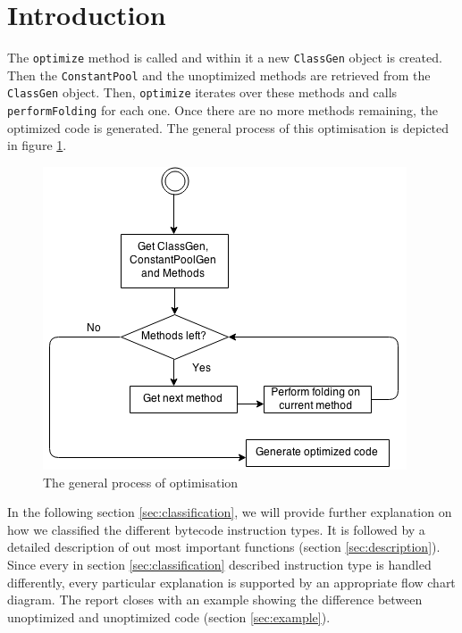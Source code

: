 \section{Introduction}

The \texttt{optimize} method is called and within it a new \texttt{ClassGen} object is created. Then the \texttt{ConstantPool} and the unoptimized methods are retrieved from the \texttt{ClassGen} object. Then, \texttt{optimize} iterates over these methods and calls \texttt{performFolding} for each one. Once there are no more methods remaining, the optimized code is generated. The general process of this optimisation is depicted in figure \ref{fig:overview}.

\begin{figure}[h]
\centering
\includegraphics[scale=0.6]{figures/overview}
\caption{The general process of optimisation}
\label{fig:overview}
\end{figure}

In the following section \ref{sec:classification}, we will provide further explanation on how we classified the different bytecode instruction types. It is followed by a detailed description of out most important functions (section \ref{sec:description}). Since every in section \ref{sec:classification} described instruction type is handled differently, every particular explanation is supported by an appropriate flow chart diagram. The report closes with an example showing the difference between unoptimized and unoptimized code (section \ref{sec:example}).